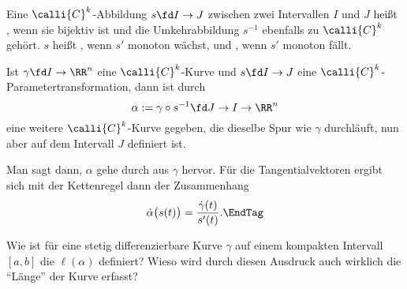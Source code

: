   \begin{antwort}
    Eine $\calli{C}^k$-Abbildung   
    $s\fd I \to J$ zwischen zwei Intervallen $I$ und 
    $J$ heißt , wenn sie bijektiv ist und 
    die Umkehrabbildung $s^{-1}$ ebenfalls zu $\calli{C}^k$ gehört. $s$ 
    heißt , wenn $s'$ monoton wächst, und 
    , wenn $s'$ monoton fällt. 

    Ist $\gamma\fd I\to \RR^n$ eine 
    $\calli{C}^k$-Kurve und $s\fd I\to J$ 
    eine $\calli{C}^k$-Parametertransformation, dann ist durch 
    \[
    \alpha := \gamma \circ s^{-1} \fd J \to I \to \RR^n
    \]
    eine weitere $\calli{C}^k$-Kurve gegeben, die dieselbe Spur 
    wie $\gamma$ durchläuft, nun aber auf dem Intervall $J$ definiert ist. 

    Man sagt dann, $\alpha$ gehe durch  aus 
    $\gamma$ hervor. Für die Tangentialvektoren ergibt sich mit der 
    Kettenregel dann der Zusammenhang
    \[
    \dot{\alpha}\big(s(t)\big)=\frac{\dot{\gamma}(t)}{s'(t)}.
    \EndTag
    \]
  \end{antwort} 

  \begin{frage}\label{kurve_bogenlaenge}
    Wie ist für eine stetig differenzierbare Kurve $\gamma$ auf einem 
    kompakten Intervall $[a,b]$ die  $\ell(\alpha)$ 
    definiert? 
    Wieso wird durch diesen Ausdruck auch wirklich die "`Länge"' 
    der Kurve erfasst?  
  \end{frage}

